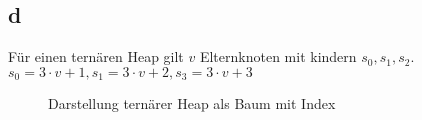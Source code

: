\documentclass{article}
\begin{document}
\subsection*{d}
Für einen ternären Heap gilt $v$ Elternknoten mit kindern $s_0,s_1,s_2$.\\
$s_0 = 3\cdot v + 1, s_1 = 3\cdot v+2, s_3=3\cdot v+3$
\begin{figure}[h!]
    \caption{Darstellung ternärer Heap als Baum mit Index}
\end{figure}
\end{document}
